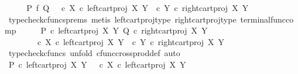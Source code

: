 \begin{isabellebody}
\ \ \isamarkupfalse%
\ \isamarkupfalse%
\ {\isachardoublequoteopen}P\ {\isasymtimes}\isactrlsub f\ Q\ {\isacharequal}{\kern0pt}\ {\isasymlangle}{\isasymf}\ {\isasymcirc}\isactrlsub c\ {\isasymbeta}\isactrlbsub X\isactrlesub \ {\isasymcirc}\isactrlsub c\ left{\isacharunderscore}{\kern0pt}cart{\isacharunderscore}{\kern0pt}proj\ X\ Y{\isacharcomma}{\kern0pt}\ {\isasymf}\ {\isasymcirc}\isactrlsub c\ {\isasymbeta}\isactrlbsub Y\isactrlesub \ {\isasymcirc}\isactrlsub c\ right{\isacharunderscore}{\kern0pt}cart{\isacharunderscore}{\kern0pt}proj\ X\ Y{\isasymrangle}{\isachardoublequoteclose}\isanewline
\ \ \ \ \isamarkupfalse%
\ {\isacharparenleft}{\kern0pt}typecheck{\isacharunderscore}{\kern0pt}cfuncs{\isacharunderscore}{\kern0pt}prems{\isacharcomma}{\kern0pt}\ metis\ left{\isacharunderscore}{\kern0pt}cart{\isacharunderscore}{\kern0pt}proj{\isacharunderscore}{\kern0pt}type\ right{\isacharunderscore}{\kern0pt}cart{\isacharunderscore}{\kern0pt}proj{\isacharunderscore}{\kern0pt}type\ terminal{\isacharunderscore}{\kern0pt}func{\isacharunderscore}{\kern0pt}comp{\isacharparenright}{\kern0pt}\isanewline
\ \ \isamarkupfalse%
\ \isamarkupfalse%
\ {\isachardoublequoteopen}{\isasymlangle}P\ {\isasymcirc}\isactrlsub c\ left{\isacharunderscore}{\kern0pt}cart{\isacharunderscore}{\kern0pt}proj\ X\ Y{\isacharcomma}{\kern0pt}\ Q\ {\isasymcirc}\isactrlsub c\ right{\isacharunderscore}{\kern0pt}cart{\isacharunderscore}{\kern0pt}proj\ X\ Y{\isasymrangle}\isanewline
\ \ \ \ \ \ {\isacharequal}{\kern0pt}\ {\isasymlangle}{\isasymf}\ {\isasymcirc}\isactrlsub c\ {\isasymbeta}\isactrlbsub X\isactrlesub \ {\isasymcirc}\isactrlsub c\ left{\isacharunderscore}{\kern0pt}cart{\isacharunderscore}{\kern0pt}proj\ X\ Y{\isacharcomma}{\kern0pt}\ {\isasymf}\ {\isasymcirc}\isactrlsub c\ {\isasymbeta}\isactrlbsub Y\isactrlesub \ {\isasymcirc}\isactrlsub c\ right{\isacharunderscore}{\kern0pt}cart{\isacharunderscore}{\kern0pt}proj\ X\ Y{\isasymrangle}{\isachardoublequoteclose}\isanewline
\ \ \ \ \isamarkupfalse%
\ {\isacharparenleft}{\kern0pt}typecheck{\isacharunderscore}{\kern0pt}cfuncs{\isacharcomma}{\kern0pt}\ unfold\ cfunc{\isacharunderscore}{\kern0pt}cross{\isacharunderscore}{\kern0pt}prod{\isacharunderscore}{\kern0pt}def{}{\isacharcomma}{\kern0pt}\ auto{\isacharparenright}{\kern0pt}\isanewline
\ \ \isamarkupfalse%
\ \isamarkupfalse%
\ {\isachardoublequoteopen}P\ {\isasymcirc}\isactrlsub c\ left{\isacharunderscore}{\kern0pt}cart{\isacharunderscore}{\kern0pt}proj\ X\ Y\ {\isacharequal}{\kern0pt}\ {\isacharparenleft}{\kern0pt}{\isasymf}\ {\isasymcirc}\isactrlsub c\ {\isasymbeta}\isactrlbsub X\isactrlesub {\isacharparenright}{\kern0pt}\ {\isasymcirc}\isactrlsub c\ left{\isacharunderscore}{\kern0pt}cart{\isacharunderscore}{\kern0pt}proj\ X\ Y\isanewline

\end{isabellebody}
